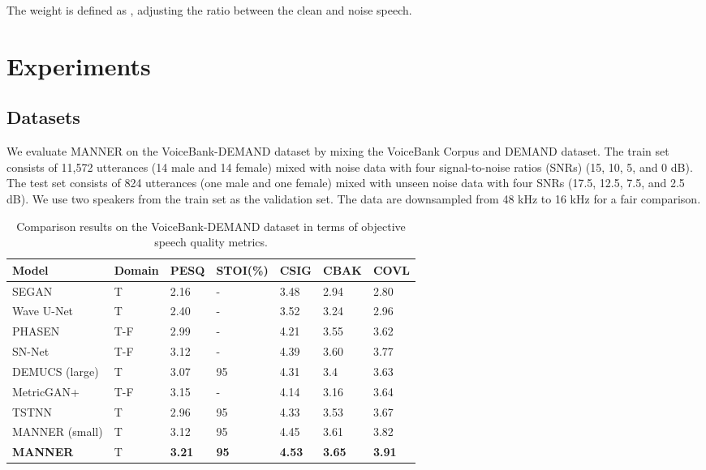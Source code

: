\documentclass{article}
\begin{document}
\noindent The weight  is defined as , adjusting the ratio between the clean and noise speech.

\section{Experiments}
\label{sec:exp}

\subsection{Datasets}
\label{sec:data}

We evaluate MANNER on the VoiceBank-DEMAND dataset \cite{valentini2017noisy} by mixing the VoiceBank Corpus and DEMAND dataset. The train set consists of 11,572 utterances (14 male and 14 female) mixed with noise data with four signal-to-noise ratios (SNRs) (15, 10, 5, and 0 dB). The test set consists of 824 utterances (one male and one female) mixed with unseen noise data with four SNRs (17.5, 12.5, 7.5, and 2.5 dB). We use two speakers from the train set as the validation set. The data are downsampled from 48 kHz to 16 kHz for a fair comparison.
\begin{table*}
\caption{Comparison results on the VoiceBank-DEMAND dataset in terms of objective speech quality metrics.}\label{table:comparison}
\centering
\begin{tabular}{M{3cm}M{1.5cm}M{2cm}M{2cm}M{2cm}M{2cm}M{2cm}} \toprule
Model &  Domain  & PESQ & STOI(\%) & CSIG & CBAK & COVL \\
\midrule
SEGAN \cite{pascual2017segan} & T & 2.16 & - & 3.48 & 2.94 & 2.80 \\
Wave U-Net \cite{macartney2018improved} & T & 2.40 & - & 3.52 & 3.24 & 2.96 \\
PHASEN \cite{yin2020phasen} & T-F & 2.99 & - & 4.21 & 3.55 & 3.62 \\
SN-Net \cite{zheng2020interactive} & T-F & 3.12 & - & 4.39 & 3.60 & 3.77 \\
DEMUCS (large) \cite{defossez2020real} & T & 3.07 & 95 & 4.31 & 3.4 & 3.63 \\ 
MetricGAN+ \cite{fu2021metricgan+} & T-F & 3.15 & - & 4.14 & 3.16 & 3.64 \\
TSTNN \cite{wang2021tstnn} & T & 2.96 & 95 & 4.33 & 3.53 & 3.67 \\ 
\midrule
MANNER (small) & T & 3.12 & 95 & 4.45 & 3.61 & 3.82 \\
\textbf{MANNER} & T & \textbf{3.21} & \textbf{95} & \textbf{4.53} & \textbf{3.65} & \textbf{3.91} \\
\bottomrule
\end{tabular}
\end{table*}
\end{document}
